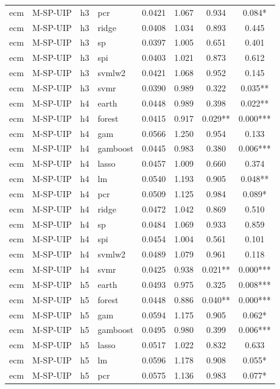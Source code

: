 \begin{ThreePartTable}
\begin{longtable}[t]{llclcccc}
ecm & M-SP-UIP & h3 & pcr & 0.0421 & 1.067 & 0.934 & 0.084*\\
ecm & M-SP-UIP & h3 & ridge & 0.0408 & 1.034 & 0.893 & 0.445\\
ecm & M-SP-UIP & h3 & sp & 0.0397 & 1.005 & 0.651 & 0.401\\
ecm & M-SP-UIP & h3 & spi & 0.0403 & 1.021 & 0.873 & 0.612\\
ecm & M-SP-UIP & h3 & svmlw2 & 0.0421 & 1.068 & 0.952 & 0.145\\
ecm & M-SP-UIP & h3 & svmr & 0.0390 & 0.989 & 0.322 & 0.035**\\
\addlinespace
ecm & M-SP-UIP & h4 & earth & 0.0448 & 0.989 & 0.398 & 0.022**\\
ecm & M-SP-UIP & h4 & forest & 0.0415 & 0.917 & 0.029** & 0.000***\\
ecm & M-SP-UIP & h4 & gam & 0.0566 & 1.250 & 0.954 & 0.133\\
ecm & M-SP-UIP & h4 & gamboost & 0.0445 & 0.983 & 0.380 & 0.006***\\
ecm & M-SP-UIP & h4 & lasso & 0.0457 & 1.009 & 0.660 & 0.374\\
ecm & M-SP-UIP & h4 & lm & 0.0540 & 1.193 & 0.905 & 0.048**\\
ecm & M-SP-UIP & h4 & pcr & 0.0509 & 1.125 & 0.984 & 0.089*\\
ecm & M-SP-UIP & h4 & ridge & 0.0472 & 1.042 & 0.869 & 0.510\\
ecm & M-SP-UIP & h4 & sp & 0.0484 & 1.069 & 0.933 & 0.859\\
ecm & M-SP-UIP & h4 & spi & 0.0454 & 1.004 & 0.561 & 0.101\\
ecm & M-SP-UIP & h4 & svmlw2 & 0.0489 & 1.079 & 0.961 & 0.118\\
ecm & M-SP-UIP & h4 & svmr & 0.0425 & 0.938 & 0.021** & 0.000***\\
\addlinespace
ecm & M-SP-UIP & h5 & earth & 0.0493 & 0.975 & 0.325 & 0.008***\\
ecm & M-SP-UIP & h5 & forest & 0.0448 & 0.886 & 0.040** & 0.000***\\
ecm & M-SP-UIP & h5 & gam & 0.0594 & 1.175 & 0.905 & 0.062*\\
ecm & M-SP-UIP & h5 & gamboost & 0.0495 & 0.980 & 0.399 & 0.006***\\
ecm & M-SP-UIP & h5 & lasso & 0.0517 & 1.022 & 0.832 & 0.633\\
ecm & M-SP-UIP & h5 & lm & 0.0596 & 1.178 & 0.908 & 0.055*\\
ecm & M-SP-UIP & h5 & pcr & 0.0575 & 1.136 & 0.983 & 0.077*\\

\end{longtable}
\end{ThreePartTable}
